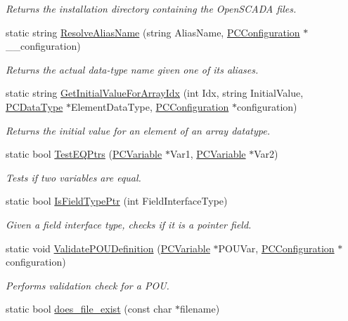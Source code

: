 \begin{DoxyCompactItemize}
\begin{DoxyCompactList}\small\item\em Returns the installation directory containing the Open\+S\+C\+A\+DA files. \end{DoxyCompactList}\item 
static string \hyperlink{classpc__emulator_1_1Utils_a70dfbf76cdece909fde22deb9e63fbeb}{Resolve\+Alias\+Name} (string Alias\+Name, \hyperlink{classpc__emulator_1_1PCConfiguration}{P\+C\+Configuration} $\ast$\+\_\+\+\_\+configuration)
\begin{DoxyCompactList}\small\item\em Returns the actual data-\/type name given one of its aliases. \end{DoxyCompactList}\item 
static string \hyperlink{classpc__emulator_1_1Utils_a798cac4cec2e2a3c18c33517b8bdeb12}{Get\+Initial\+Value\+For\+Array\+Idx} (int Idx, string Initial\+Value, \hyperlink{classpc__emulator_1_1PCDataType}{P\+C\+Data\+Type} $\ast$Element\+Data\+Type, \hyperlink{classpc__emulator_1_1PCConfiguration}{P\+C\+Configuration} $\ast$configuration)
\begin{DoxyCompactList}\small\item\em Returns the initial value for an element of an array datatype. \end{DoxyCompactList}\item 
static bool \hyperlink{classpc__emulator_1_1Utils_ae118fc67b4598048bbd2d52f35357d45}{Test\+E\+Q\+Ptrs} (\hyperlink{classpc__emulator_1_1PCVariable}{P\+C\+Variable} $\ast$Var1, \hyperlink{classpc__emulator_1_1PCVariable}{P\+C\+Variable} $\ast$Var2)
\begin{DoxyCompactList}\small\item\em Tests if two variables are equal. \end{DoxyCompactList}\item 
static bool \hyperlink{classpc__emulator_1_1Utils_a0a9a00edeb05ecfcee3d57e89118d584}{Is\+Field\+Type\+Ptr} (int Field\+Interface\+Type)
\begin{DoxyCompactList}\small\item\em Given a field interface type, checks if it is a pointer field. \end{DoxyCompactList}\item 
static void \hyperlink{classpc__emulator_1_1Utils_a78c55b2d1c4bfb235a4cca17c64c961f}{Validate\+P\+O\+U\+Definition} (\hyperlink{classpc__emulator_1_1PCVariable}{P\+C\+Variable} $\ast$P\+O\+U\+Var, \hyperlink{classpc__emulator_1_1PCConfiguration}{P\+C\+Configuration} $\ast$configuration)
\begin{DoxyCompactList}\small\item\em Performs validation check for a P\+OU. \end{DoxyCompactList}\item 
static bool \hyperlink{classpc__emulator_1_1Utils_a371876272564acb678293057ddfb07fb}{does\+\_\+file\+\_\+exist} (const char $\ast$filename)\hypertarget{classpc__emulator_1_1Utils_a371876272564acb678293057ddfb07fb}{}\label{classpc__emulator_1_1Utils_a371876272564acb678293057ddfb07fb}


\end{DoxyCompactItemize}
